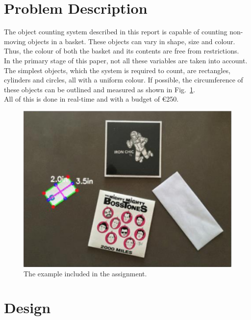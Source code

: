 \documentclass[11pt]{article}
\begin{document}
\section{Problem Description}

The object counting system described in this report is capable of counting non-moving objects in a basket. These objects can vary in shape, size and colour. Thus, the colour of both the basket and its contents are free from restrictions.\\
In the primary stage of this paper, not all these variables are taken into account. The simplest objects, which the system is required to count, are rectangles, cylinders and circles, all with a uniform colour. If possible, the circumference of these objects can be outlined and measured as shown in Fig.~\ref{fig:example}.\\ All of this is done in real-time and with a budget of \euro 250.

\begin{figure}[h]
\centering
  \includegraphics[width=0.7\linewidth]{opdracht.png}
  \caption{The example included in the assignment.}
  \label{fig:example}
\end{figure}

\section{Design}
\end{document}
